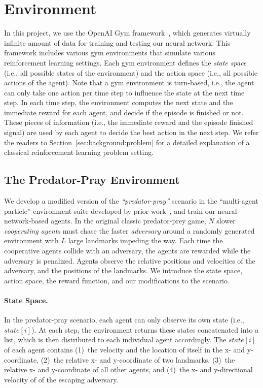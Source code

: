 
\section{Environment}
\label{sec:application}

In this project, we use the OpenAI Gym framework~\cite{gym.openai16}, which
generates virtually infinite amount of data for training and testing our
neural network. This framework includes various gym environments that simulate
various reinforcement learning settings. Each gym environment defines the
\emph{state space} (i.e., all possible states of the environment) and the
action space (i.e., all possible actions of the agent). Note that a gym
environment is turn-based, i.e., the agent can only take one action per time
step to influence the state at the next time step. In each time step, the
environment computes the next state and the immediate reward for each agent,
and decide if the episode is finished or not. These pieces of information
(i.e., the immediate reward and the episode finished signal) are used by each
agent to decide the best action in the next step. We refer the readers to
Section~\ref{sec:background:problem} for a detailed explanation of a classical
reinforcement learning problem setting.

\subsection{The Predator-Pray Environment}

We develop a modified version of the \emph{``predator-pray''} scenario
in the ``multi-agent particle'' environment suite developed by prior
work~\cite{lowe2017multi, mordatch2017emergence}, and train our
neural-network-based agents. In the original classic predator-prey game, $N$
slower \emph{cooperating agents} must chase the faster \emph{adversary}
around a randomly
generated environment with $L$ large landmarks impeding the way. Each time the
cooperative agents collide with an adversary, the agents are rewarded
while the adversary is penalized. Agents observe the relative positions and
velocities of the adversary, and the positions of the landmarks. We introduce
the state space, action space, the reward function, and our modifications to
the scenario.

\paragraph{State Space.} In the predator-pray scenario, each agent can only
observe its own state (i.e., $state[i]$). At each step, the environment
returns these states concatenated into a list, which is then distributed to
each individual agent accordingly. The $state[i]$ of each agent contains 
(1)~the velocity and the location of itself in the x- and y-coordinate,
(2)~the relative x- and y-coordinate of two landmarks,
(3)~the relative x- and y-coordinate of all other agents, and
(4)~the x- and y-directional velocity of of the escaping adversary.

